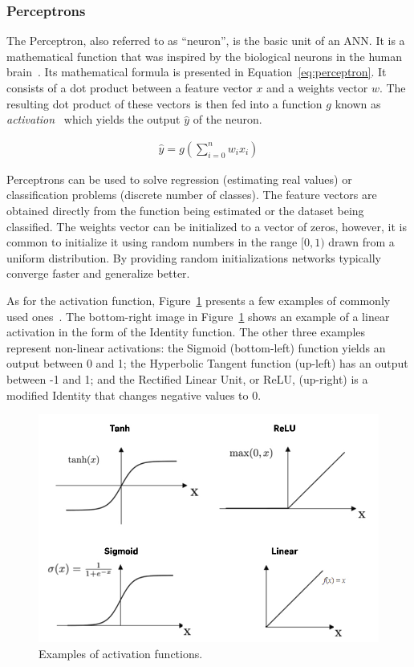 \subsubsection{Perceptrons}

The Perceptron, also referred to as ``neuron'', is the basic unit of an ANN. It
is a mathematical function that was inspired by the biological neurons in the
human brain~\cite{rosenblatt1958perceptron}. Its mathematical formula is presented in Equation~\ref{eq:perceptron}. It consists of a dot product between a feature vector $x$
and a weights vector $w$. The resulting dot product of these vectors is then fed
into a function $g$ known as \textit{activation}~\cite{activation_functions} which yields the output
$\hat{y}$ of the neuron.

\begin{align}
    \hat{y} = g\left(\sum^n_{i=0} w_ix_i\right)
    \label{eq:perceptron}
\end{align}

Perceptrons can be used to solve regression (estimating real values) or
classification problems (discrete number of classes). The feature vectors are
obtained directly from the function being estimated or the dataset being
classified. The weights vector can be initialized to a vector of zeros, however,
it is common to initialize it using random numbers in the range $[0,1)$ drawn
from a uniform distribution. By providing random initializations networks
typically converge faster and generalize better.

As for the activation function, Figure~\ref{fig:activations} presents a few
examples of commonly used ones~\cite{activation_functions}. The bottom-right image in
Figure~\ref{fig:activations} shows an example of a linear activation in the form
of the Identity function. The other three examples represent non-linear
activations: the Sigmoid (bottom-left) function yields an output between 0 and
1; the Hyperbolic Tangent function (up-left) has an output between -1 and 1; and
the Rectified Linear Unit, or ReLU, (up-right) is a modified Identity that
changes negative values to 0.

\begin{figure}[!htbp]
    \centering
    \includegraphics[width=.5\textwidth]{Images/activations.jpg}
    \caption{Examples of activation functions.}
    \label{fig:activations}
\end{figure}


